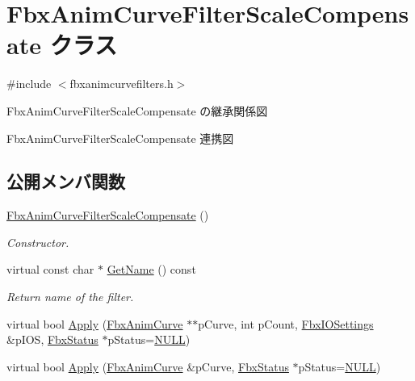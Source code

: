 \hypertarget{class_fbx_anim_curve_filter_scale_compensate}{}\section{Fbx\+Anim\+Curve\+Filter\+Scale\+Compensate クラス}
\label{class_fbx_anim_curve_filter_scale_compensate}


{\ttfamily \#include $<$fbxanimcurvefilters.\+h$>$}



Fbx\+Anim\+Curve\+Filter\+Scale\+Compensate の継承関係図


Fbx\+Anim\+Curve\+Filter\+Scale\+Compensate 連携図
\subsection*{公開メンバ関数}
\begin{DoxyCompactItemize}
\item 
\hyperlink{class_fbx_anim_curve_filter_scale_compensate_a4927bdefc9eea75da7461f4a9a7f418c}{Fbx\+Anim\+Curve\+Filter\+Scale\+Compensate} ()
\begin{DoxyCompactList}\small\item\em Constructor. \end{DoxyCompactList}\item 
virtual const char $\ast$ \hyperlink{class_fbx_anim_curve_filter_scale_compensate_af6564ed47826563b148a2c41901e4f03}{Get\+Name} () const
\begin{DoxyCompactList}\small\item\em Return name of the filter. \end{DoxyCompactList}\item 
virtual bool \hyperlink{class_fbx_anim_curve_filter_scale_compensate_a0b9bf864fac2179f7172d737929cbdb6}{Apply} (\hyperlink{class_fbx_anim_curve}{Fbx\+Anim\+Curve} $\ast$$\ast$p\+Curve, int p\+Count, \hyperlink{class_fbx_i_o_settings}{Fbx\+I\+O\+Settings} \&p\+I\+OS, \hyperlink{class_fbx_status}{Fbx\+Status} $\ast$p\+Status=\hyperlink{fbxarch_8h_a070d2ce7b6bb7e5c05602aa8c308d0c4}{N\+U\+LL})
\item 
virtual bool \hyperlink{class_fbx_anim_curve_filter_scale_compensate_ae1cb78bcd44d445bb5d8b9bd2aaa3142}{Apply} (\hyperlink{class_fbx_anim_curve}{Fbx\+Anim\+Curve} \&p\+Curve, \hyperlink{class_fbx_status}{Fbx\+Status} $\ast$p\+Status=\hyperlink{fbxarch_8h_a070d2ce7b6bb7e5c05602aa8c308d0c4}{N\+U\+LL})
\end{DoxyCompactItemize}
